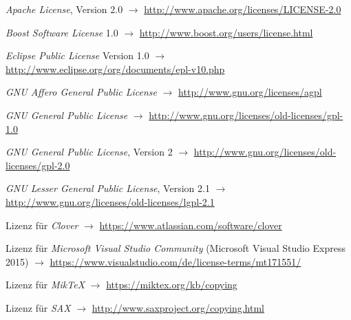 \documentclass[english,ngerman,parskip=half,headsepline,footsepline]{scrreprt}
\begin{document}
    \begin{minipage}{\textwidth-10.95pt}
    	\listoffigures
    \end{minipage}\par
	\thispagestyle{scrheadings}
	
   	\begin{flushleft}
		\begin{thebibliography}{12}
			\thispagestyle{scrheadings}			
        	
			\emph{Apache License}, Version 2.0 $\rightarrow$ \url{http://www.apache.org/licenses/LICENSE-2.0}
			
			\emph{Boost Software License} 1.0 $\rightarrow$ \url{http://www.boost.org/users/license.html}
			
			\emph{Eclipse Public License} Version 1.0 $\rightarrow$ \url{http://www.eclipse.org/org/documents/epl-v10.php}
			
			\emph{GNU Affero General Public License} $\rightarrow$ \url{http://www.gnu.org/licenses/agpl}
			
			\emph{GNU General Public License} $\rightarrow$ \url{http://www.gnu.org/licenses/old-licenses/gpl-1.0}
			
			\emph{GNU General Public License}, Version 2 $\rightarrow$ \url{http://www.gnu.org/licenses/old-licenses/gpl-2.0}
			
			\emph{GNU Lesser General Public License}, Version 2.1 $\rightarrow$ \url{http://www.gnu.org/licenses/old-licenses/lgpl-2.1}
			
			Lizenz für \emph{Clover} $\rightarrow$ \url{https://www.atlassian.com/software/clover}
			
			Lizenz für \emph{Microsoft Visual Studio Community} (Microsoft Visual Studio Express 2015) $\rightarrow$ \url{https://www.visualstudio.com/de/license-terms/mt171551/}
			
			Lizenz für \emph{MikTeX} $\rightarrow$ \url{https://miktex.org/kb/copying}
				
			Lizenz für \emph{SAX} $\rightarrow$ \url{http://www.saxproject.org/copying.html}
			

\end{thebibliography}
\end{flushleft}
\end{document}
